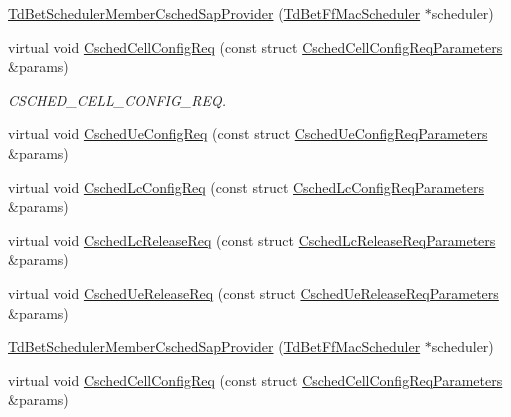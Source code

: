 \begin{DoxyCompactItemize}
\item 
\hyperlink{classns3_1_1TdBetSchedulerMemberCschedSapProvider_a75a9f25ef2a2eec01d8f8921fe25b685}{Td\+Bet\+Scheduler\+Member\+Csched\+Sap\+Provider} (\hyperlink{classns3_1_1TdBetFfMacScheduler}{Td\+Bet\+Ff\+Mac\+Scheduler} $\ast$scheduler)
\item 
virtual void \hyperlink{classns3_1_1TdBetSchedulerMemberCschedSapProvider_aaa482763b0ca4b3c05578d9de99f05d8}{Csched\+Cell\+Config\+Req} (const struct \hyperlink{structns3_1_1FfMacCschedSapProvider_1_1CschedCellConfigReqParameters}{Csched\+Cell\+Config\+Req\+Parameters} \&params)
\begin{DoxyCompactList}\small\item\em C\+S\+C\+H\+E\+D\+\_\+\+C\+E\+L\+L\+\_\+\+C\+O\+N\+F\+I\+G\+\_\+\+R\+EQ. \end{DoxyCompactList}\item 
virtual void \hyperlink{classns3_1_1TdBetSchedulerMemberCschedSapProvider_a537e39b61f21423188e36edd65a9e9d1}{Csched\+Ue\+Config\+Req} (const struct \hyperlink{structns3_1_1FfMacCschedSapProvider_1_1CschedUeConfigReqParameters}{Csched\+Ue\+Config\+Req\+Parameters} \&params)
\item 
virtual void \hyperlink{classns3_1_1TdBetSchedulerMemberCschedSapProvider_ae9ce507922e8e6a7e74665fea4be1d4b}{Csched\+Lc\+Config\+Req} (const struct \hyperlink{structns3_1_1FfMacCschedSapProvider_1_1CschedLcConfigReqParameters}{Csched\+Lc\+Config\+Req\+Parameters} \&params)
\item 
virtual void \hyperlink{classns3_1_1TdBetSchedulerMemberCschedSapProvider_ab98a333337979066c4e799654369b8d5}{Csched\+Lc\+Release\+Req} (const struct \hyperlink{structns3_1_1FfMacCschedSapProvider_1_1CschedLcReleaseReqParameters}{Csched\+Lc\+Release\+Req\+Parameters} \&params)
\item 
virtual void \hyperlink{classns3_1_1TdBetSchedulerMemberCschedSapProvider_a3e2936a22059eeab7dea7e296b1fa8a7}{Csched\+Ue\+Release\+Req} (const struct \hyperlink{structns3_1_1FfMacCschedSapProvider_1_1CschedUeReleaseReqParameters}{Csched\+Ue\+Release\+Req\+Parameters} \&params)
\item 
\hyperlink{classns3_1_1TdBetSchedulerMemberCschedSapProvider_a75a9f25ef2a2eec01d8f8921fe25b685}{Td\+Bet\+Scheduler\+Member\+Csched\+Sap\+Provider} (\hyperlink{classns3_1_1TdBetFfMacScheduler}{Td\+Bet\+Ff\+Mac\+Scheduler} $\ast$scheduler)
\item 
virtual void \hyperlink{classns3_1_1TdBetSchedulerMemberCschedSapProvider_a7d83f2f1d9bce42efa367258925a654f}{Csched\+Cell\+Config\+Req} (const struct \hyperlink{structns3_1_1FfMacCschedSapProvider_1_1CschedCellConfigReqParameters}{Csched\+Cell\+Config\+Req\+Parameters} \&params)

\end{DoxyCompactItemize}
